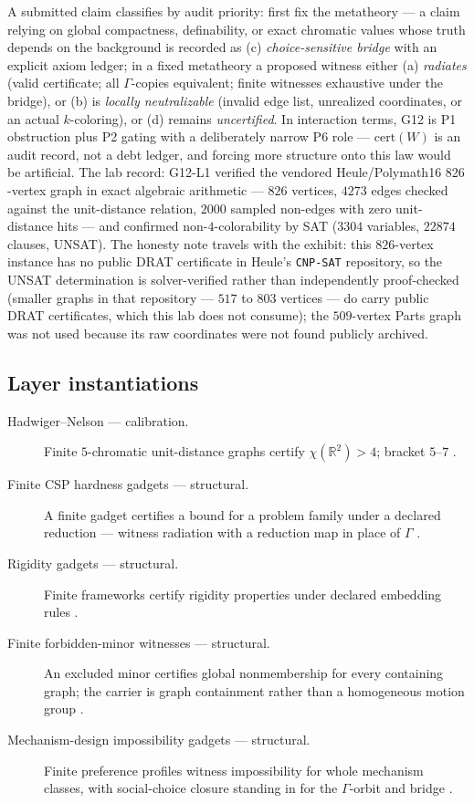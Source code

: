 \documentclass[11pt]{article}
\theoremstyle{definition}
\begin{document}
A submitted claim classifies by audit priority: first fix the metatheory --- a claim relying on
global compactness, definability, or exact chromatic values whose truth depends on the background is
recorded as (c) \emph{choice-sensitive bridge} with an explicit axiom ledger; in a fixed metatheory a
proposed witness either (a) \emph{radiates} (valid certificate; all $\Gamma$-copies equivalent;
finite witnesses exhaustive under the bridge), or (b) is \emph{locally neutralizable} (invalid edge
list, unrealized coordinates, or an actual $k$-coloring), or (d) remains \emph{uncertified}. In
interaction terms, G12 is P1 obstruction plus P2 gating with a deliberately narrow P6 role ---
$\mathrm{cert}(W)$ is an audit record, not a debt ledger, and forcing more structure onto this law
would be artificial. The lab record: G12-L1 verified the vendored Heule/Polymath16 $826$-vertex graph
in exact algebraic arithmetic --- $826$ vertices, $4273$ edges checked against the unit-distance
relation, $2000$ sampled non-edges with zero unit-distance hits --- and confirmed non-$4$-colorability
by SAT ($3304$ variables, $22874$ clauses, UNSAT). The honesty note travels with the exhibit: this
$826$-vertex instance has no public DRAT certificate in Heule's \texttt{CNP-SAT} repository, so the
UNSAT determination is solver-verified rather than independently proof-checked (smaller graphs in
that repository --- $517$ to $803$ vertices --- do carry public DRAT certificates, which this lab
does not consume); the $509$-vertex Parts graph was not used because its raw coordinates were not
found publicly archived.

\subsection*{Layer instantiations}\label{layer-inst:G12}
\begin{description}
  \item[Hadwiger--Nelson --- calibration.] Finite $5$-chromatic unit-distance graphs certify
    $\chi(\mathbb{R}^2) > 4$; bracket $5$--$7$
    \citep{DeGrey2018,Heule2018,Parts2020,BruijnErdos1951}.
  \item[Finite CSP hardness gadgets --- structural.] A finite gadget certifies a bound for a problem
    family under a declared reduction --- witness radiation with a reduction map in place of $\Gamma$
    \citep{GareyJohnsonStockmeyer1976}.
  \item[Rigidity gadgets --- structural.] Finite frameworks certify rigidity properties under
    declared embedding rules \citep{Laman1970,AsimowRoth1978}.
  \item[Finite forbidden-minor witnesses --- structural.] An excluded minor certifies global
    nonmembership for every containing graph; the carrier is graph containment rather than a
    homogeneous motion group \citep{RobertsonSeymour2004}.
  \item[Mechanism-design impossibility gadgets --- structural.] Finite preference profiles witness
    impossibility for whole mechanism classes, with social-choice closure standing in for the
    $\Gamma$-orbit and bridge \citep{Gibbard1973,Satterthwaite1975}.
\end{description}
\end{document}
